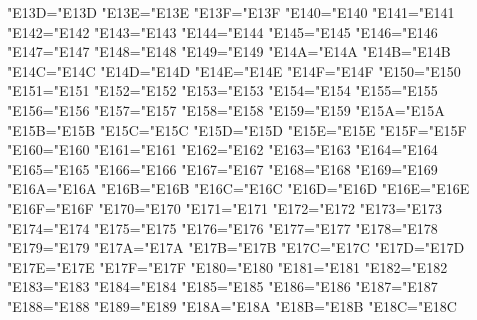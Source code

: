     \lccode"E13D="E13D
    \lccode"E13E="E13E
    \lccode"E13F="E13F
    \lccode"E140="E140
    \lccode"E141="E141
    \lccode"E142="E142
    \lccode"E143="E143
    \lccode"E144="E144
    \lccode"E145="E145
    \lccode"E146="E146
    \lccode"E147="E147
    \lccode"E148="E148
    \lccode"E149="E149
    \lccode"E14A="E14A
    \lccode"E14B="E14B
    \lccode"E14C="E14C
    \lccode"E14D="E14D
    \lccode"E14E="E14E
    \lccode"E14F="E14F
    \lccode"E150="E150
    \lccode"E151="E151
    \lccode"E152="E152
    \lccode"E153="E153
    \lccode"E154="E154
    \lccode"E155="E155
    \lccode"E156="E156
    \lccode"E157="E157
    \lccode"E158="E158
    \lccode"E159="E159
    \lccode"E15A="E15A
    \lccode"E15B="E15B
    \lccode"E15C="E15C
    \lccode"E15D="E15D
    \lccode"E15E="E15E
    \lccode"E15F="E15F
    \lccode"E160="E160
    \lccode"E161="E161
    \lccode"E162="E162
    \lccode"E163="E163
    \lccode"E164="E164
    \lccode"E165="E165
    \lccode"E166="E166
    \lccode"E167="E167
    \lccode"E168="E168
    \lccode"E169="E169
    \lccode"E16A="E16A
    \lccode"E16B="E16B
    \lccode"E16C="E16C
    \lccode"E16D="E16D
    \lccode"E16E="E16E
    \lccode"E16F="E16F
    \lccode"E170="E170
    \lccode"E171="E171
    \lccode"E172="E172
    \lccode"E173="E173
    \lccode"E174="E174
    \lccode"E175="E175
    \lccode"E176="E176
    \lccode"E177="E177
    \lccode"E178="E178
    \lccode"E179="E179
    \lccode"E17A="E17A
    \lccode"E17B="E17B
    \lccode"E17C="E17C
    \lccode"E17D="E17D
    \lccode"E17E="E17E
    \lccode"E17F="E17F
    \lccode"E180="E180
    \lccode"E181="E181
    \lccode"E182="E182
    \lccode"E183="E183
    \lccode"E184="E184
    \lccode"E185="E185
    \lccode"E186="E186
    \lccode"E187="E187
    \lccode"E188="E188
    \lccode"E189="E189
    \lccode"E18A="E18A
    \lccode"E18B="E18B
    \lccode"E18C="E18C
    
\else
\fi\else
\fi
\endgroup
